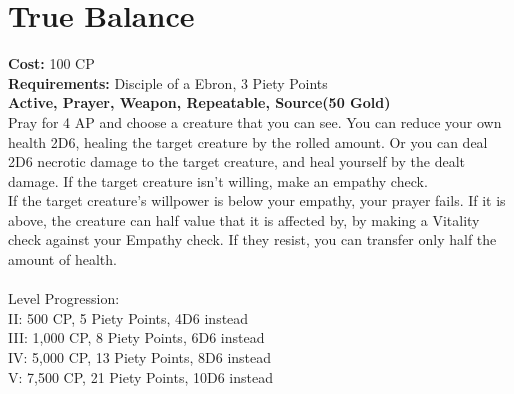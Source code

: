 \section{True Balance}\label{prayer:trueBalance}
\textbf{Cost:} 100 CP\\
\textbf{Requirements:} Disciple of a Ebron, 3 Piety Points \\
\textbf{Active, Prayer, Weapon, Repeatable, Source(50 Gold)}\\
Pray for 4 AP and choose a creature that you can see.
You can reduce your own health 2D6, healing the target creature by the rolled amount.
Or you can deal 2D6 necrotic damage to the target creature, and heal yourself by the dealt damage.
If the target creature isn't willing, make an empathy check.\\
If the target creature's willpower is below your empathy, your prayer fails.
If it is above, the creature can half value that it is affected by, by making a Vitality check against your Empathy check.
If they resist, you can transfer only half the amount of health.\\
\\
Level Progression:\\
II: 500 CP, 5 Piety Points, 4D6 instead\\
III: 1,000 CP, 8 Piety Points, 6D6 instead\\
IV: 5,000 CP, 13 Piety Points, 8D6 instead\\
V: 7,500 CP, 21 Piety Points, 10D6 instead\\
